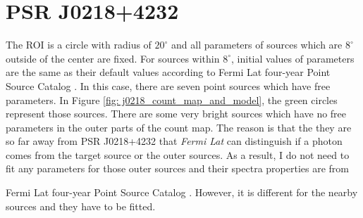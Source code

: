 \documentclass[12pt]{report}
\newcommand{\mycaption}[1]{\protect \caption{#1}}
\newcommand{\fgl}[0]{
  Fermi Lat four-year Point Source Catalog
}
\begin{document}
          \begin{table}[!ht]
            \centering
            \mycaption{Fit results with data from year 2009 to year 2018. The physical 
              meanings of $\Gamma$ and $E_c$ are the same as Table 
              \ref{table: previous_result_comparison}}
            \label{table: 2018_fit_data}
          \end{table}

        \section{PSR J0218+4232}
          The ROI is a circle with radius of $20^\circ$ and all parameters of sources which 
          are $8^\circ$ outside of the center are fixed. For sources within $8^\circ$, initial
          values of parameters are the same as their default values according to \fgl.
          In this case, there are seven point sources which have free parameters. In Figure
          \ref{fig: j0218_count_map_and_model}, the green circles represent those sources.
          There are some very bright sources which have no free parameters
          in the outer parts of the count map. The reason is that the they are so far away 
          from PSR J0218+4232 that \textit{Fermi Lat} can distinguish if a photon comes 
          from the target source or the outer sources. As a result, I do not need to fit 
          any parameters for those outer sources and their spectra properties are from 
          \fgl. However, it is different for the nearby sources and they have to be fitted.
          
\end{document}
